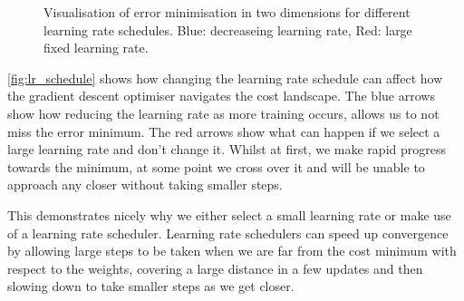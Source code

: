 \begin{figure}
\begin{center}
\caption{Visualisation of error minimisation in two dimensions for different learning rate schedules. Blue: decreaseing learning rate, Red: large fixed learning rate.}
\label{fig:lr_schedule}
\end{center}
\end{figure}

\autoref{fig:lr_schedule} shows how changing the learning rate schedule can affect how the gradient descent optimiser navigates the cost landscape. The blue arrows show how reducing the learning rate as more training occurs, allows us to not miss the error minimum. The red arrows show what can happen if we select a large learning rate and don't change it. Whilst at first, we make rapid progress towards the minimum, at some point we cross over it and will be unable to approach any closer without taking smaller steps.

This demonstrates nicely why we either select a small learning rate or make use of a learning rate scheduler.
Learning rate schedulers can speed up convergence by allowing large steps to be taken when we are far from the cost minimum with respect to the weights, covering a large distance in a few updates and then slowing down to take smaller steps as we get closer. 

